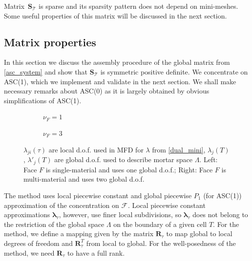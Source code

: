 \documentclass[12pt]{article}
\newcommand{\svginputw}[2][\linewidth]{\def\svgwidth{#1}} %
\newcommand{\vect}[1]{\boldsymbol{\mathbf{#1}}}
\newcommand{\bmesh}{{\vect{\mathcal T}}}
\newcommand{\mmesh}{{\vect{\mathcal \tau}}}
\newcommand{\bfaces}[1][]{{\vect{\mathcal F}_{\text{#1}}}}
\begin{document}
Matrix~$\vect S_\bmesh$ is sparse and its sparsity pattern does not depend on mini-meshes. Some useful properties of this matrix will be discussed in the next section.

\subsection{Matrix properties}

In this section we discuss the assembly procedure of the global matrix from \eqref{asc_system} and show that $\vect S_\bmesh$ is symmetric positive definite. We concentrate on ASC(1), which we implement and validate  in the next section. We shall make necessary remarks about ASC(0) as it is largely obtained by obvious simplifications of ASC(1).
	
\begin{figure}[h]
	\centering		
	\begin{subfigure}{.45\linewidth}
		\centering
		\svginputw{e_plus_1.pdf_tex}
		\caption{$\nu_F = 1$}%
		\label{fig:asc_dofs:asc1:pc}
	\end{subfigure}%
	\qquad\quad
	\begin{subfigure}{.45\linewidth}
		\centering
		\svginputw{e_plus_2.pdf_tex}
		\caption{$\nu_F = 3$}		
	\end{subfigure}
	\caption{$\lambda_{ji}(\mmesh)$ are local d.o.f. used in MFD for $\lambda$ from \eqref{dual_mini}, $\lambda_j(T)$, $\lambda'_j(T)$ are global d.o.f. used to describe mortar space $\Lambda$. Left: Face $F$ is single-material and uses one global d.o.f.; Right: Face $F$ is multi-material and uses two global d.o.f.
	\label{fig:asc_dofs:asc1:mmc}}
\end{figure}
	
The method uses local piecewise constant  and global piecewise $P_1$ \big(for ASC(1)\big) approximation of the concentration on $\bfaces$. Local piecewise constant approximations $\vect\lambda_\mmesh$, however, use finer local subdivisions, so $\vect\lambda_\mmesh$ does not belong to the restriction of the global space $\Lambda$ on the boundary of a given cell $T$. For the method, we define a mapping given by the matrix $\vect R_\mmesh$ to map global to local degrees of freedom and $\vect R_\mmesh^T$ from local   to global. For the well-posedness of the method, we need $\vect R_\mmesh$ to have a full rank.
\end{document}
